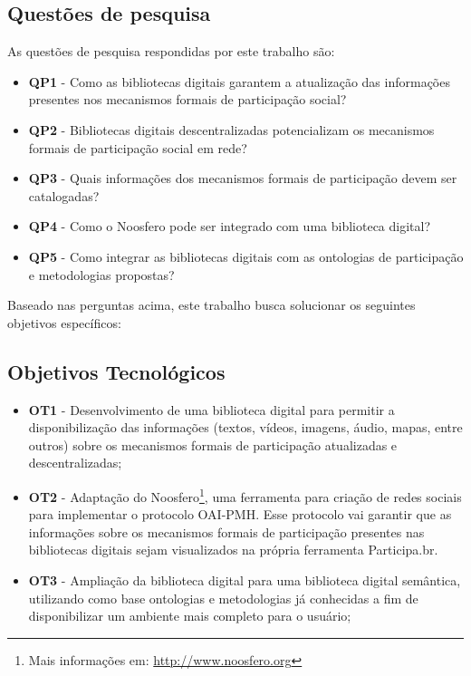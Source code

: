 \subsection{Questões de pesquisa}

As questões de pesquisa respondidas por este trabalho são:

\begin{itemize}
\item \textbf{QP1} - Como as bibliotecas digitais garantem a atualização das informações presentes nos mecanismos formais de participação social?
\item \textbf{QP2} - Bibliotecas digitais descentralizadas potencializam os mecanismos formais de participação social em rede?
\item \textbf{QP3} - Quais informações dos mecanismos formais de participação devem ser catalogadas?
\item \textbf{QP4} - Como o Noosfero pode ser integrado com uma biblioteca digital?
\item \textbf{QP5} - Como integrar as bibliotecas digitais com as ontologias de participação e metodologias propostas?
\end{itemize} 

Baseado nas perguntas acima, este trabalho busca solucionar os seguintes objetivos específicos: 

\subsection*{Objetivos Tecnológicos}

\begin{itemize}
\item \textbf{OT1} - Desenvolvimento de uma biblioteca digital para permitir a disponibilização das informações (textos, vídeos, imagens, áudio, mapas, entre outros) sobre os mecanismos formais de participação atualizadas e descentralizadas;
\item \textbf{OT2} - Adaptação do Noosfero\footnote{Mais informações em: \url{http://www.noosfero.org}}, uma ferramenta para criação de redes sociais para implementar o protocolo OAI-PMH. Esse protocolo vai garantir que as informações sobre os mecanismos formais de participação presentes nas bibliotecas digitais sejam visualizados na própria ferramenta Participa.br.
\item \textbf{OT3} - Ampliação da biblioteca digital para uma biblioteca digital semântica, utilizando como base ontologias e metodologias já conhecidas a fim de disponibilizar um ambiente mais completo para o usuário;
\end{itemize}

